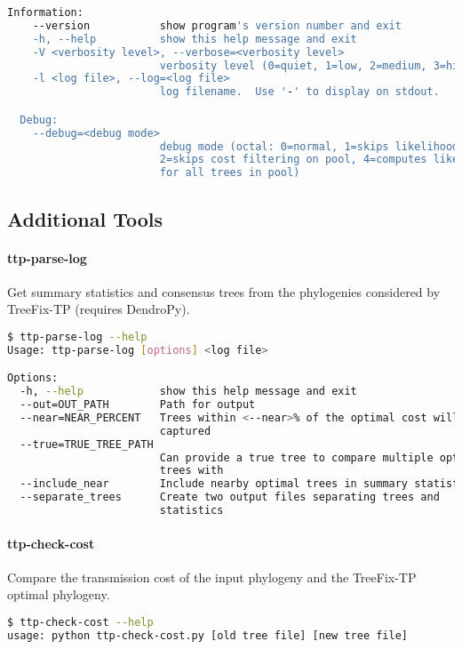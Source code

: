 \documentclass[11pt]{article}
\begin{document}
\begin{lstlisting}[language=Bash]
  Information:
    --version           show program's version number and exit
    -h, --help          show this help message and exit
    -V <verbosity level>, --verbose=<verbosity level>
                        verbosity level (0=quiet, 1=low, 2=medium, 3=high)
    -l <log file>, --log=<log file>
                        log filename.  Use '-' to display on stdout.

  Debug:
    --debug=<debug mode>
                        debug mode (octal: 0=normal, 1=skips likelihood test,
                        2=skips cost filtering on pool, 4=computes likelihood
                        for all trees in pool)
\end{lstlisting}
\vspace{2mm}

\subsection{Additional Tools}
\paragraph{ttp-parse-log}

Get summary statistics and consensus trees from the phylogenies considered by TreeFix-TP  (requires DendroPy).

\begin{lstlisting}[language=Bash]
$ ttp-parse-log --help
Usage: ttp-parse-log [options] <log file>

Options:
  -h, --help            show this help message and exit
  --out=OUT_PATH        Path for output
  --near=NEAR_PERCENT   Trees within <--near>% of the optimal cost will be
                        captured
  --true=TRUE_TREE_PATH
                        Can provide a true tree to compare multiple optimal
                        trees with
  --include_near        Include nearby optimal trees in summary statistics
  --separate_trees      Create two output files separating trees and
                        statistics
\end{lstlisting}
\vspace{2mm}

\paragraph{ttp-check-cost}
Compare the transmission cost of the input phylogeny and the TreeFix-TP optimal phylogeny.

\begin{lstlisting}[language=Bash]
$ ttp-check-cost --help
usage: python ttp-check-cost.py [old tree file] [new tree file]
\end{lstlisting}
\vspace{2mm}
\end{document}
